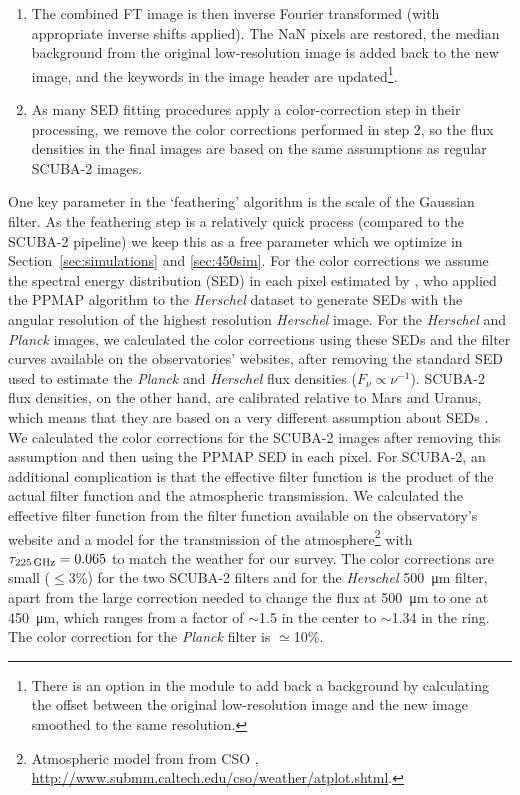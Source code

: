 \documentclass[a4paper,fleqn,usenatbib, twocolumn]{aastex63}
\begin{document}
\begin{enumerate}
  \item The combined FT image is then inverse Fourier transformed (with appropriate inverse shifts applied). The 
  NaN pixels are restored, the median background from the original
  low-resolution image is added back to the new image, and the keywords in the image header are updated\footnote{There is an option in the module to add back a 
  background by calculating the offset between the original low-resolution image and the new image smoothed to the same resolution.}.
  
  \item As many SED fitting procedures apply a color-correction step in their processing, we remove the color corrections performed in step 2, so the flux densities in the final images are based on the same assumptions as regular
  SCUBA-2 images.
\end{enumerate}

One key parameter in the `feathering' algorithm is the scale of the Gaussian filter. As the feathering step is a relatively quick process (compared to the
SCUBA-2 pipeline) we keep this as a free parameter which we optimize in Section~\ref{sec:simulations} and \ref{sec:450sim}.
For the color corrections  we assume the spectral energy distribution (SED) in each pixel estimated by \citet{Whitworth2019}, 
who applied the PPMAP algorithm to the {\it Herschel} dataset to generate SEDs with the angular resolution of the
highest resolution {\it Herschel} image. 
For the {\it Herschel} and {\it Planck} images, we calculated the color corrections using these SEDs and the filter curves available on the observatories' websites, after removing the standard SED used to estimate the {\it Planck} and {\it Herschel} flux densities ($F_{\nu} \propto \nu^{-1}$).
SCUBA-2 flux densities, on the other hand, are calibrated relative to Mars and Uranus, which means that they are based on a very different assumption about SEDs \citep[roughly $F_{\nu} \propto \nu^{1.7}$,][]{Lellouch2008,Orton2014}. We calculated the color corrections for the SCUBA-2 images after removing this assumption and then using the PPMAP SED in
each pixel. For SCUBA-2, an additional complication is that the effective filter
function is the product of the actual filter function and the atmospheric
transmission. We calculated the effective filter function from the
filter function available on the observatory's website and a model for the
transmission of the atmosphere\footnote{Atmospheric model from from CSO \citep{Pardo2001}, \url{http://www.submm.caltech.edu/cso/weather/atplot.shtml}.} with $\tau_{\rm 225\,GHz}=0.065$ to match the weather for our survey. The color corrections are small ($\leq$3\%) for the two SCUBA-2 filters and for the {\it Herschel} \SI{500}{\micro\meter} filter, apart from the large correction
needed to change the flux at \SI{500}{\micro\meter} to one at \SI{450}{\micro\meter}, which ranges
from  a factor of $\sim$1.5 in the center to 
$\sim$1.34 in the ring. The color correction for the {\it Planck} filter
is $\simeq$10\%.
\end{document}
